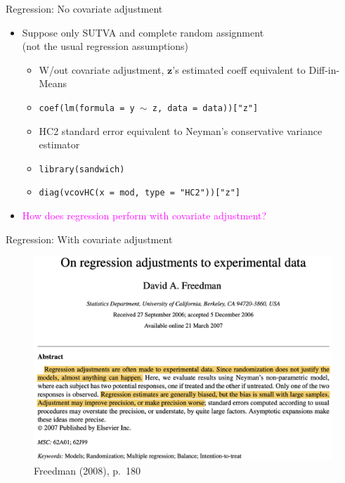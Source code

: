 \documentclass[table, xcolor = {dvipsnames}, 9pt]{beamer}
\theoremstyle{plain}
\begin{document}
\begin{frame}{Regression: No covariate adjustment} \vfill
\begin{itemize} \vfill
\item Suppose only SUTVA and complete random assignment \\ (not the usual regression assumptions) \vfill
\begin{itemize} \vfill
\item W/out covariate adjustment, $\bm{z}$'s estimated coeff equivalent to Diff-in-Means \vfill
\item[] \texttt{coef(lm(formula = y $\sim$ z, data = data))["z"]} \vfill
\item HC2 standard error equivalent to Neyman's conservative variance estimator \vfill
\item[] \texttt{library(sandwich)} \\ 
\item[] \texttt{diag(vcovHC(x = mod, type = "HC2"))["z"]}
\end{itemize} \vfill
\item \textcolor{magenta}{How does regression perform with covariate adjustment?} \\ \citep{freedman2008a,freedman2008b,lin2013,cohenfogarty2023} \vfill
\end{itemize} \vfill
\end{frame}
\begin{frame}{Regression: With covariate adjustment} \vfill
\begin{figure}[H]
\includegraphics[width=0.9\linewidth]{Freedman_2008.png}
\caption{Freedman (2008), p.~180}
\end{figure}
\end{frame}
\end{document}

